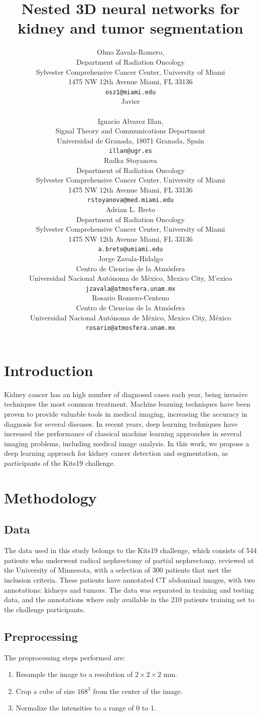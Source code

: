 \documentclass{article}
\title{Nested 3D neural networks for kidney and tumor segmentation}
\author{
  Olmo Zavala-Romero,\\
  Department of Radiation Oncology\\
  Sylvester Comprehensive Cancer Center, University of Miami\\
  1475 NW 12th Avenue Miami, FL 33136\\
  \texttt{osz1@miami.edu} \\
  \And
  Javier \\
  \texttt{} \\
  \AND
  Ignacio Alvarez Illan,\\
  Signal Theory and Communications Department\\
  Universidad de Granada, 18071 Granada, Spain\\
  \texttt{illan@ugr.es} \\
  \AND
  Radka Stoyanova\\
  Department of Radiation Oncology\\
  Sylvester Comprehensive Cancer Center, University of Miami\\
  1475 NW 12th Avenue Miami, FL 33136\\
  \texttt{rstoyanova@med.miami.edu} \\
  \AND
 Adrian L. Breto\\
 Department of Radiation Oncology\\
 Sylvester Comprehensive Cancer Center, University of Miami\\
 1475 NW 12th Avenue
 Miami, FL 33136\\
 \texttt{a.breto@umiami.edu} \\
 \AND
  Jorge Zavala-Hidalgo\\
  Centro de Ciencias de la Atm\'osfera\\
  Universidad Nacional Aut\'onoma de M\'exico, Mexico City, M'exico\\
  \texttt{jzavala@atmosfera.unam.mx} \\
  \AND
  Rosario Romero-Centeno\\
  Centro de Ciencias de la Atm\'osfera\\
  Universidad Nacional Aut\'onoma de M\'exico, Mexico City, M\'exico\\
  \texttt{rosario@atmosfera.unam.mx} \\
}
\begin{document}
\maketitle

\begin{abstract}

\end{abstract}



\section{Introduction}
\label{sec:intro}

Kidney cancer has an high number of diagnosed cases each year, being invasive techniques the most common treatment\cite{sun_treatment_2012}. Machine learning techniques have been proven to provide valuable tools in medical imaging, increasing the accuracy in diagnosis for several diseases\cite{erickson_machine_2017}. In recent years, deep learning techniques have increased the performance of classical machine learning approaches in several imaging problems, including medical image analysis\cite{litjens_survey_2017}. In this work, we propose a deep learning approach for kidney cancer detection and segmentation, as participants of the Kits19 challenge.

\section{Methodology}
\label{sec:methods}
\subsection{Data}

The data used in this study belongs to the Kits19 challenge\cite{heller_kits19_2019}, which consists of 544 patients who underwent radical nephrectomy of partial nephrectomy, reviewed at the University of Minnesota, with a selection of 300 patients that met the inclusion criteria. These patients have annotated CT abdominal images, with two annotations: kidneys and tumors. The data was separated in training and testing data, and the annotations where only available in the 210 patients training set to the challenge participants. 

\label{sec:data}
\subsection{Preprocessing}
\label{sec:prepro}
The proprocessing steps performed are:
\begin{enumerate}
    \item Resample the image to a resolution of $2 \times 2 \times 2$ mm. 
    \item Crop a cube of size $168^3$ from the center of the image. 
    \item Normalize the intensities to a range of 0 to 1.
\end{enumerate}
\end{document}
